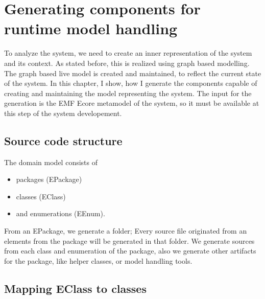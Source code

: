 \chapter{Generating components for runtime model handling}

To analyze the system, we need to create an inner representation of the system and its context. 
As stated before, this is realized using graph based modelling. 
The graph based live model is created and maintained, to reflect the current state of the system. 
In this chapter, I show, how I generate the \cpp{} components capable of creating and maintaining the model representing the system. 
The input for the generation is the EMF Ecore metamodel of the system, so it must be available at this step of the system developement. 


\section{Source code structure}

The domain model consists of 
\begin{itemize}
	\item packages (EPackage)
	\item classes (EClass) 
	\item and enumerations (EEnum).
\end{itemize}

From an EPackage, we generate a folder; Every source file originated from an elements from the package will be generated in that folder. 
We generate sources from each class and enumeration of the package, also we generate other artifacts for the package, like helper classes, or model handling tools.


\section{Mapping EClass to \protect\cpptt{} classes}


